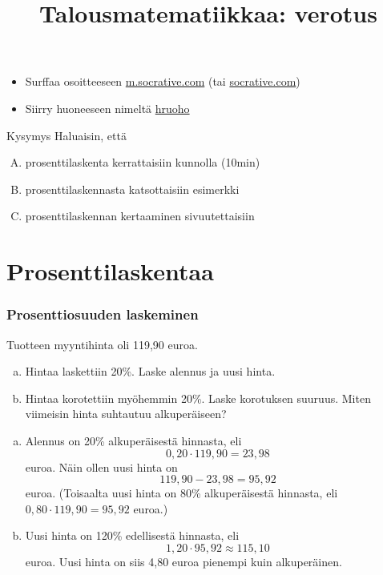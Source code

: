 \documentclass{beamer}
\title{Talousmatematiikkaa: verotus}
\newcommand{\socrativeOhje}{
\begin{itemize}
\item Surffaa osoitteeseen \url{m.socrative.com} (tai \url{socrative.com})
\item Siirry huoneeseen nimeltä \url{hruoho}
\end{itemize}
}
\begin{document}
\begin{frame}
\maketitle
\end{frame}
\begin{frame}
\tableofcontents
\end{frame}
\begin{frame}

\socrativeOhje
\begin{block}{Kysymys}
Haluaisin, että
\begin{enumerate}[(A)]
\item prosenttilaskenta kerrattaisiin kunnolla (10min)
\item prosenttilaskennasta katsottaisiin esimerkki
\item prosenttilaskennan kertaaminen sivuutettaisiin
\end{enumerate}
\end{block}
\end{frame}

\section{Prosenttilaskentaa}
\begin{frame}
\frametitle{Prosenttiosuuden laskeminen}
	\begin{esim}
		Tuotteen myyntihinta oli 119,90 euroa. 
		\begin{enumerate}[(a)]
			\item Hintaa laskettiin 20\%. Laske alennus ja uusi hinta.
			\item Hintaa korotettiin myöhemmin 20\%. Laske korotuksen suuruus. Miten viimeisin hinta suhtautuu alkuperäiseen?
		\end{enumerate}
	\end{esim}
\end{frame}
\begin{frame}
	\begin{ratkaisu}
		\begin{enumerate}[(a)]
			\item Alennus on 20\% alkuperäisestä hinnasta\pause , eli 
			\[
			0,20\cdot119,90 = 23,98
			\] euroa. \pause Näin ollen uusi hinta on 
			\[
			119,90-23,98 = 95,92
			\] euroa. \pause (Toisaalta uusi hinta on 80\% alkuperäisestä hinnasta, eli \(
			0,80\cdot 119,90 = 95,92\) euroa.)
			\item \pause Uusi hinta on 120\% edellisestä hinnasta\pause , eli
			\[
			1,20\cdot95,92\approx 115,10
			\] euroa. \pause Uusi hinta on siis 4,80 euroa pienempi kuin alkuperäinen.
		\end{enumerate}
	\end{ratkaisu}
\end{frame}
\end{document}
